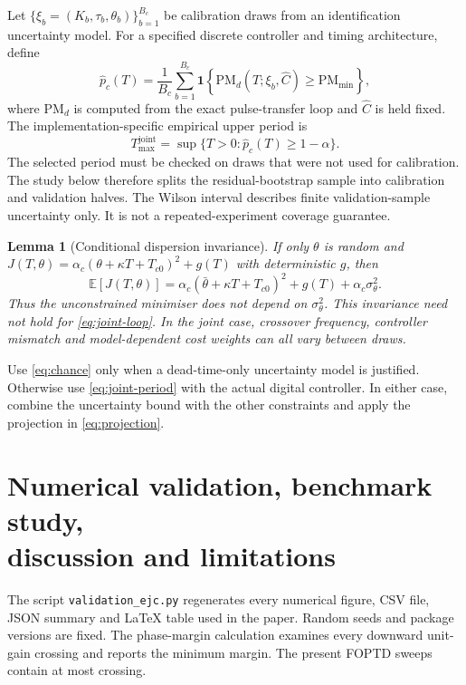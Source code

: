 \documentclass[a4paper,fleqn]{cas-sc}
\newtheorem{lemma}{Lemma}
\theoremstyle{remark}
\newcommand{\Tmax}{T_{\max}}
\newcommand{\E}{\mathbb{E}}
\begin{document}
Let $\{\xi_b=(K_b,\tau_b,\theta_b)\}_{b=1}^{B_c}$ be calibration draws from an identification uncertainty model. For a specified discrete controller and timing architecture, define
\begin{equation}
\widehat p_c(T)=\frac{1}{B_c}\sum_{b=1}^{B_c}
\mathbf{1}\!\left\{\mathrm{PM}_{d}(T;\xi_b,\widehat C)
\geq\mathrm{PM}_{\min}\right\},
\label{eq:empirical-chance}
\end{equation}
where $\mathrm{PM}_{d}$ is computed from the exact pulse-transfer loop and $\widehat C$ is held fixed. The implementation-specific empirical upper period is
\begin{equation}
\Tmax^{\mathrm{joint}}=
\sup\{T>0:\widehat p_c(T)\geq1-\alpha\}.
\label{eq:joint-period}
\end{equation}
The selected period must be checked on draws that were not used for calibration. The study below therefore splits the residual-bootstrap sample into calibration and validation halves. The Wilson interval describes finite validation-sample uncertainty only. It is not a repeated-experiment coverage guarantee.

\begin{lemma}[Conditional dispersion invariance]
\label{lem:invariance}
If only $\theta$ is random and
$J(T,\theta)=\alpha_c(\theta+\kappa T+T_{c0})^2+g(T)$ with deterministic $g$, then
\begin{equation}
\E[J(T,\theta)]=\alpha_c(\bar\theta+\kappa T+T_{c0})^2
+g(T)+\alpha_c\sigma_\theta^2.
\label{eq:invariance}
\end{equation}
Thus the unconstrained minimiser does not depend on $\sigma_\theta^2$. This invariance need not hold for \cref{eq:joint-loop}. In the joint case, crossover frequency, controller mismatch and model-dependent cost weights can all vary between draws.
\end{lemma}

Use \cref{eq:chance} only when a dead-time-only uncertainty model is justified. Otherwise use \cref{eq:joint-period} with the actual digital controller. In either case, combine the uncertainty bound with the other constraints and apply the projection in \cref{eq:projection}.

\section[Numerical validation, benchmark study, discussion and limitations]{Numerical validation, benchmark study,\\ discussion and limitations}
\label{sec:numerical-checks}
The script \texttt{validation\_ejc.py} regenerates every numerical figure, CSV file, JSON summary and LaTeX table used in the paper. Random seeds and package versions are fixed. The phase-margin calculation examines every downward unit-gain crossing and reports the minimum margin. The present FOPTD sweeps contain at most \BenchMaxCrossings{} crossing.
\end{document}
